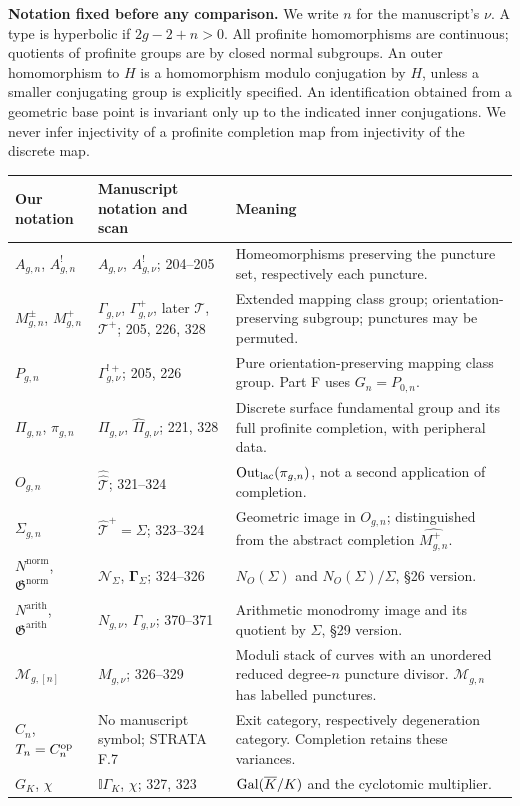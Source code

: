 \noindent\textbf{Notation fixed before any comparison.}
We write $n$ for the manuscript's $\nu$. A type is hyperbolic if $2g-2+n>0$.
All profinite homomorphisms are continuous; quotients of profinite groups are by closed normal subgroups. An outer homomorphism to $H$ is a homomorphism modulo conjugation by $H$, unless a smaller conjugating group is explicitly specified. An identification obtained from a geometric base point is invariant only up to the indicated inner conjugations. We never infer injectivity of a profinite completion map from injectivity of the discrete map.
\begin{center}\small
\begin{tabularx}{\textwidth}{@{}L{.19\textwidth}L{.32\textwidth}Y@{}}
\toprule
Our notation & Manuscript notation and scan & Meaning\\\midrule
$A_{g,n}$, $A^!_{g,n}$ & $A_{g,\nu}$, $A^!_{g,\nu}$; 204--205 & Homeomorphisms preserving the puncture set, respectively each puncture.\\
$M^{\pm}_{g,n}$, $M^+_{g,n}$ & $\Gamma_{g,\nu}$, $\Gamma^+_{g,\nu}$, later $\mathcal T$, $\mathcal T^+$; 205, 226, 328 & Extended mapping class group; orientation-preserving subgroup; punctures may be permuted.\\
$P_{g,n}$ & $\Gamma^{!+}_{g,\nu}$; 205, 226 & Pure orientation-preserving mapping class group. Part F uses $G_n=P_{0,n}$.\\
$\Pi_{g,n}$, $\pi_{g,n}$ & $\Pi_{g,\nu}$, $\widehat\Pi_{g,\nu}$; 221, 328 & Discrete surface fundamental group and its full profinite completion, with peripheral data.\\
$O_{g,n}$ & $\widehat{\widehat{\mathcal T}}$; 321--324 & $\operatorname{Out}_{\mathrm{lac}}(\pi_{g,n})$, not a second application of completion.\\
$\Sigma_{g,n}$ & $\widehat{\mathcal T}^{+}=\Sigma$; 323--324 & Geometric image in $O_{g,n}$; distinguished from the abstract completion $\widehat{M^+_{g,n}}$.\\
$N^{\mathrm{norm}}$, $\mathfrak G^{\mathrm{norm}}$ & $\mathcal N_\Sigma$, $\boldsymbol\Gamma_\Sigma$; 324--326 & $N_{O}(\Sigma)$ and $N_{O}(\Sigma)/\Sigma$, \S26 version.\\
$N^{\mathrm{arith}}$, $\mathfrak G^{\mathrm{arith}}$ & $N_{g,\nu}$, $\Gamma_{g,\nu}$; 370--371 & Arithmetic monodromy image and its quotient by $\Sigma$, \S29 version.\\
$\mathscr M_{g,[n]}$ & $M_{g,\nu}$; 326--329 & Moduli stack of curves with an unordered reduced degree-$n$ puncture divisor. $\mathscr M_{g,n}$ has labelled punctures.\\
$C_n$, $T_n=C_n^{\mathrm{op}}$ & No manuscript symbol; STRATA F.7 & Exit category, respectively degeneration category. Completion retains these variances.\\
$G_K$, $\chi$ & $\mathbb I\Gamma_K$, $\chi$; 327, 323 & $\operatorname{Gal}(\overline K/K)$ and the cyclotomic multiplier.\\\bottomrule
\end{tabularx}
\end{center}
